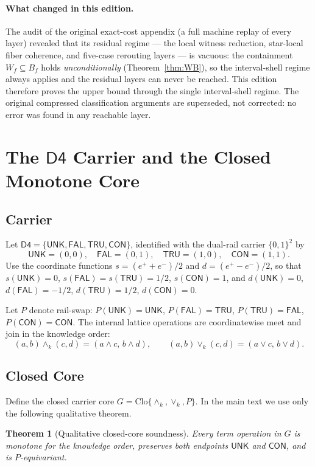 \documentclass[11pt]{article}
\newtheorem{theorem}{Theorem}
\theoremstyle{remark}
\newcommand{\Dfour}{\ensuremath{\mathsf{D4}}}
\newcommand{\UNK}{\ensuremath{\mathsf{UNK}}}
\newcommand{\FAL}{\ensuremath{\mathsf{FAL}}}
\newcommand{\TRU}{\ensuremath{\mathsf{TRU}}}
\newcommand{\CON}{\ensuremath{\mathsf{CON}}}
\newcommand{\meetk}{\ensuremath{\wedge_k}}
\newcommand{\joink}{\ensuremath{\vee_k}}
\newcommand{\Clo}{\ensuremath{\mathrm{Clo}}}
\begin{document}
\paragraph{What changed in this edition.}
The audit of the original exact-cost appendix (a full machine replay of
every layer) revealed that its residual regime --- the local witness
reduction, star-local fiber coherence, and five-case rerouting layers --- is
vacuous: the containment $W_f\subseteq B_f$ holds \emph{unconditionally}
(Theorem~\ref{thm:WB}), so the interval-shell regime always applies and the
residual layers can never be reached. This edition therefore proves the
upper bound through the single interval-shell regime. The original
compressed classification arguments are superseded, not corrected: no error
was found in any reachable layer.

\section{The \Dfour{} Carrier and the Closed Monotone Core}

\subsection{Carrier}
Let $\Dfour=\{\UNK,\FAL,\TRU,\CON\}$, identified with the dual-rail carrier
$\{0,1\}^2$ by
\[
\UNK=(0,0),\quad \FAL=(0,1),\quad \TRU=(1,0),\quad \CON=(1,1).
\]
Use the coordinate functions $s=(e^++e^-)/2$ and $d=(e^+-e^-)/2$, so that
$s(\UNK)=0$, $s(\FAL)=s(\TRU)=1/2$, $s(\CON)=1$, and $d(\UNK)=0$,
$d(\FAL)=-1/2$, $d(\TRU)=1/2$, $d(\CON)=0$.

Let $P$ denote rail-swap: $P(\UNK)=\UNK$, $P(\FAL)=\TRU$, $P(\TRU)=\FAL$,
$P(\CON)=\CON$. The internal lattice operations are coordinatewise meet and
join in the knowledge order:
\[
(a,b)\meetk(c,d)=(a\wedge c,\,b\wedge d),\qquad
(a,b)\joink(c,d)=(a\vee c,\,b\vee d).
\]

\subsection{Closed Core}
Define the closed carrier core $G=\Clo\{\meetk,\joink,P\}$. In the main
text we use only the following qualitative theorem.

\begin{theorem}[Qualitative closed-core soundness]\label{thm:core}
Every term operation in $G$ is monotone for the knowledge order, preserves
both endpoints $\UNK$ and $\CON$, and is $P$-equivariant.
\end{theorem}
\end{document}
